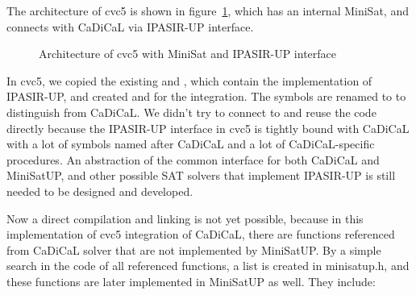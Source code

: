 The architecture of cvc5 is shown in figure~\ref{fig:cvc5}, which has an internal MiniSat, and connects with CaDiCaL via IPASIR-UP interface.

\begin{figure}[h!]
  \centering
  
  \caption{Architecture of cvc5 with MiniSat and IPASIR-UP interface}
  \label{fig:cvc5}
\end{figure}

In cvc5, we copied the existing  and , which contain the implementation of IPASIR-UP, and created  and  for the integration. The symbols are renamed to  to distinguish from CaDiCaL. We didn't try to connect to and reuse the code directly because the IPASIR-UP interface in cvc5 is tightly bound with CaDiCaL with a lot of symbols named after CaDiCaL and a lot of CaDiCaL-specific procedures. An abstraction of the common interface for both CaDiCaL and MiniSatUP, and other possible SAT solvers that implement IPASIR-UP is still needed to be designed and developed.

Now a direct compilation and linking is not yet possible, because in this implementation of cvc5 integration of CaDiCaL, there are functions referenced from CaDiCaL solver that are not implemented by MiniSatUP. By a simple search in the code of all referenced functions, a list is created in minisatup.h, and these functions are later implemented in MiniSatUP as well. They include:

